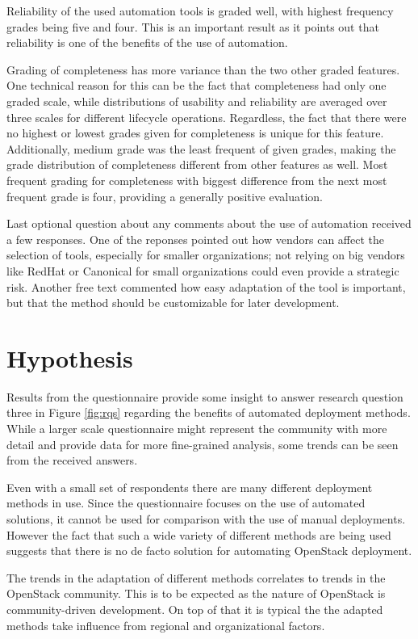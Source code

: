 Reliability of the used automation tools is graded well, with highest frequency
grades being five and four. This is an important result as it points out that
reliability is one of the benefits of the use of automation.

Grading of completeness has more variance than the two other graded features.
One technical reason for this can be the fact that completeness had only one
graded scale, while distributions of usability and reliability are averaged
over three scales for different lifecycle operations. Regardless, the fact that
there were no highest or lowest grades given for completeness is unique for
this feature. Additionally, medium grade was the least frequent of given
grades, making the grade distribution of completeness different from other
features as well. Most frequent grading for completeness with biggest
difference from the next most frequent grade is four, providing a generally
positive evaluation.

Last optional question about any comments about the use of automation received
a few responses. One of the reponses pointed out how vendors can affect the
selection of tools, especially for smaller organizations; not relying on big
vendors like RedHat or Canonical for small organizations could even provide a
strategic risk. Another free text commented how easy adaptation of the tool is
important, but that the method should be customizable for later development.

\section{Hypothesis}

Results from the questionnaire provide some insight to answer research question
three in Figure \ref{fig:rqs} regarding the benefits of automated deployment
methods. While a larger scale questionnaire might represent the community with
more detail and provide data for more fine-grained analysis, some trends can be
seen from the received answers.

Even with a small set of respondents there are many different deployment
methods in use. Since the questionnaire focuses on the use of automated
solutions, it cannot be used for comparison with the use of manual deployments.
However the fact that such a wide variety of different methods are being used
suggests that there is no de facto solution for automating OpenStack
deployment.

The trends in the adaptation of different methods correlates to trends in the
OpenStack community. This is to be expected as the nature of OpenStack is
community-driven development. On top of that it is typical the the adapted
methods take influence from regional and organizational factors.

